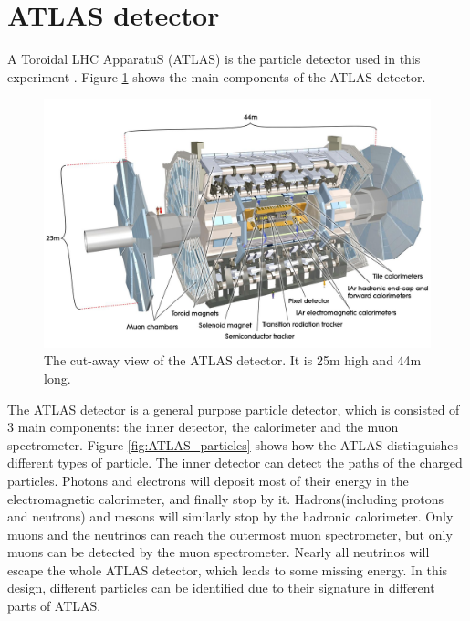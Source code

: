\section{ATLAS detector}
\label{sec:detector_ATLAS}

A Toroidal LHC ApparatuS (ATLAS) is the particle detector used in this experiment \cite{ATLAS_doc}.
Figure \ref{fig:detector_ATLAS} shows the main components of the ATLAS detector.
\begin{figure}
\centering
\includegraphics[width=\textwidth]{data/photo/ATLAS.jpg}
\caption{The cut-away view of the ATLAS detector. It is 25m high and 44m long. \cite{ATLAS_photo}}
\label{fig:detector_ATLAS}
\end{figure}
The ATLAS detector is a general purpose particle detector, which is consisted of 3 main components: the inner detector, the calorimeter and the muon spectrometer.
Figure \ref{fig:ATLAS_particles} shows how the ATLAS distinguishes different types of particle. The inner detector can detect the paths of the charged particles.
Photons and electrons will deposit most of their energy in the electromagnetic calorimeter, and finally stop by it.
Hadrons(including protons and neutrons) and mesons will similarly stop by the hadronic calorimeter.
Only muons and the neutrinos can reach the outermost muon spectrometer, but only muons can be detected by the muon spectrometer.
Nearly all neutrinos will escape the whole ATLAS detector, which leads to some missing energy.
In this design, different particles can be identified due to their signature in different parts of ATLAS.
